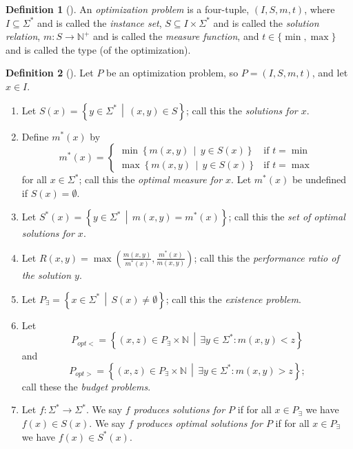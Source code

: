 \documentclass[]{article}
\theoremstyle{definition} \newtheorem{definition}{Definition}
\theoremstyle{definition} \newtheorem{openquestion}{Open question}
\newcommand{\lb}{\left\{}
\newcommand{\rb}{\right\}}
\newcommand{\st}{\,\middle|\,}
\begin{document}
\begin{definition}[\cite{acgkmp99}]
  An \emph{optimization problem} is a four-tuple, $(I, S, m, t)$, where $I\subseteq \Sigma^*$ and is called the \emph{instance set}, $S\subseteq I\times \Sigma^*$ and is called the \emph{solution relation}, $m\colon S\to \mathbb{N}^+$ and is called the \emph{measure function}, and $t\in\{\min, \max\}$ and is called the type (of the optimization).
\end{definition}

\begin{definition}[\cite{tantau07}]
  Let $P$ be an optimization problem, so $P=(I, S, m, t)$, and let $x\in I$.
  \begin{enumerate}
  \item Let $S(x)=\lb y\in\Sigma^* \st (x, y)\in S \rb$; call this the \emph{solutions for $x$}.
  \item Define $m^*(x)$ by
    \begin{displaymath}
      m^*(x) =
      \begin{cases}
        \min \lb m(x, y) \st y\in S(x) \rb & \text{if } t = \min \\
        \max \lb m(x, y) \st y\in S(x) \rb & \text{if } t = \max
      \end{cases}
    \end{displaymath}
    for all $x\in \Sigma^*$; call this the \emph{optimal measure for $x$}.
    Let $m^*(x)$ be undefined if $S(x)=\emptyset$.
  \item Let $S^*(x)=\lb y\in\Sigma^* \st m(x, y) = m^*(x) \rb$; call this the \emph{set of optimal solutions for $x$}.
  \item Let $R(x, y)=\max\left( \frac{m(x, y)}{m^*(x)}, \frac{m^*(x)}{m(x, y)} \right)$; call this the \emph{performance ratio of the solution $y$}.
  \item Let $P_\exists = \lb x\in \Sigma^* \st S(x) \neq \emptyset \rb$; call this the \emph{existence problem}.
  \item Let
    \begin{displaymath}
      P_{opt<}=\lb (x, z) \in P_\exists\times\mathbb{N} \st \exists y\in\Sigma^*\colon m(x, y) < z \rb
    \end{displaymath}
    and
    \begin{displaymath}
      P_{opt>}=\lb (x, z) \in P_\exists\times\mathbb{N} \st \exists y\in\Sigma^*\colon m(x, y) > z \rb;
    \end{displaymath}
    call these the \emph{budget problems}.
  \item Let $f\colon \Sigma^*\to\Sigma^*$.
    We say \emph{$f$ produces solutions for $P$} if for all $x\in P_\exists$ we have $f(x)\in S(x)$.
    We say \emph{$f$ produces optimal solutions for $P$} if for all $x\in P_\exists$ we have $f(x)\in S^*(x)$.
  \end{enumerate}
\end{definition}
\end{document}
